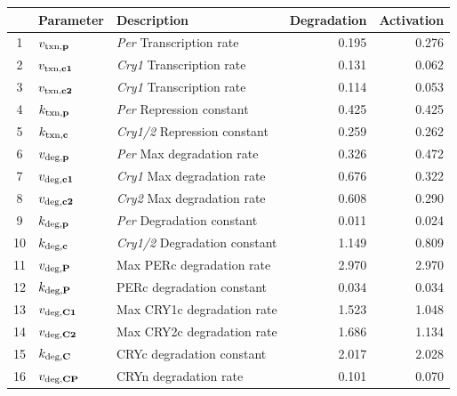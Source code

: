 \begin{table}[h]
  \label{tab:parset}
  \vspace{2mm}
  \centering
  \begin{tabular}{cllrr} \toprule
       & Parameter                 & Description                       & Degradation & Activation \\ \midrule
    1  & $v_{\text{txn,{\bf p}}}$  & {\it Per} Transcription rate      & 0.195       & 0.276 \\
    2  & $v_{\text{txn,{\bf c1}}}$ & {\it Cry1} Transcription rate     & 0.131       & 0.062 \\
    3  & $v_{\text{txn,{\bf c2}}}$ & {\it Cry1} Transcription rate     & 0.114       & 0.053 \\
    4  & $k_{\text{txn,{\bf p}}}$  & {\it Per} Repression constant     & 0.425       & 0.425 \\
    5  & $k_{\text{txn,{\bf c}}}$  & {\it Cry1/2} Repression constant  & 0.259       & 0.262 \\
    6  & $v_{\text{deg,{\bf p}}}$  & {\it Per} Max degradation rate    & 0.326       & 0.472 \\
    7  & $v_{\text{deg,{\bf c1}}}$ & {\it Cry1} Max degradation rate   & 0.676       & 0.322 \\
    8  & $v_{\text{deg,{\bf c2}}}$ & {\it Cry2} Max degradation rate   & 0.608       & 0.290 \\
    9  & $k_{\text{deg,{\bf p}}}$  & {\it Per} Degradation constant    & 0.011       & 0.024 \\
    10 & $k_{\text{deg,{\bf c}}}$  & {\it Cry1/2} Degradation constant & 1.149       & 0.809 \\
    11 & $v_{\text{deg,{\bf P}}}$  & Max PERc degradation rate         & 2.970       & 2.970 \\
    12 & $k_{\text{deg,{\bf P}}}$  & PERc degradation constant         & 0.034       & 0.034 \\
    13 & $v_{\text{deg,{\bf C1}}}$ & Max CRY1c degradation rate        & 1.523       & 1.048 \\
    14 & $v_{\text{deg,{\bf C2}}}$ & Max CRY2c degradation rate        & 1.686       & 1.134 \\
    15 & $k_{\text{deg,{\bf C}}}$  & CRYc degradation constant         & 2.017       & 2.028 \\
    16 & $v_{\text{deg,{\bf CP}}}$ & CRYn degradation rate             & 0.101       & 0.070 \\

\end{tabular}
\end{table}

